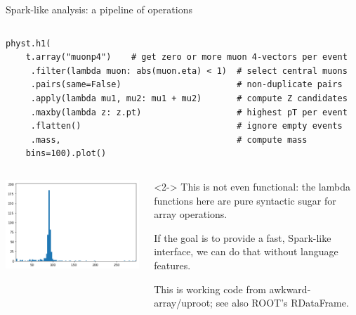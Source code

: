 \documentclass[aspectratio=169]{beamer}
\begin{document}
\begin{frame}[fragile]{Spark-like analysis: a pipeline of operations}
\small
\begin{columns}
\begin{verbatim}
physt.h1(
    t.array("muonp4")    # get zero or more muon 4-vectors per event
     .filter(lambda muon: abs(muon.eta) < 1)  # select central muons
     .pairs(same=False)                       # non-duplicate pairs
     .apply(lambda mu1, mu2: mu1 + mu2)       # compute Z candidates
     .maxby(lambda z: z.pt)                   # highest pT per event
     .flatten()                               # ignore empty events
     .mass,                                   # compute mass
    bins=100).plot()
\end{verbatim}
\end{columns}

\vspace{0.25 cm}
\begin{columns}
\includegraphics[width=\linewidth]{zpeak.png}

\begin{uncoverenv}<2->
\normalsize
\hspace{-0.15 cm}This is not even functional: the lambda functions here are pure syntactic sugar for array operations.

\vspace{0.25 cm}
If the goal is to provide a fast, Spark-like interface, we can do that without language features.

\vspace{0.25 cm}
This is working code from awkward-array/uproot; see also ROOT's RDataFrame.

\mbox{ }
\end{uncoverenv}
\end{columns}
\end{frame}
\end{document}
